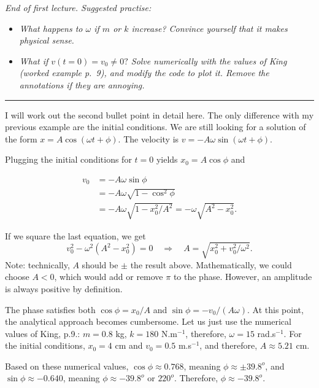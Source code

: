 \documentclass[11pt]{article}
\begin{document}
\emph{End of first lecture. Suggested practise:}

\begin{itemize}
\item
  \emph{What happens to \(\omega\) if \(m\) or \(k\) increase? Convince
  yourself that it makes physical sense.}
\item
  \emph{What if \(v(t=0) = v_0 \neq 0?\) Solve numerically with the
  values of King (worked example p.~9), and modify the code to plot it.
  Remove the annotations if they are annoying.}
\end{itemize}

\begin{center}\rule{0.5\linewidth}{\linethickness}\end{center}

    I will work out the second bullet point in detail here. The only
difference with my previous example are the initial conditions. We are
still looking for a solution of the form \(x = A\cos(\omega t + \phi)\).
The velocity is \(v = -A\omega\sin(\omega t + \phi)\).

Plugging the initial conditions for \(t=0\) yields \(x_0 = A \cos\phi\)
and

\begin{align*}
    v_0 & = -A\omega\sin\phi \\
        & = -A\omega\sqrt{1-\cos^2\phi} \\
        & = -A\omega\sqrt{1-x_0^2/A^2} = -\omega\sqrt{A^2-x_0^2}.
\end{align*}

    If we square the last equation, we get
\[ v_0^2 - \omega^2(A^2 - x_0^2) = 0 \quad\Rightarrow\quad  A = \sqrt{x_0^2 + v_0^2/\omega^2}. \]
Note: technically, \(A\) should be \(\pm\) the result above.
Mathematically, we could choose \(A<0\), which would add or remove
\(\pi\) to the phase. However, an amplitude is always positive by
definition.

    The phase satisfies both \(\cos\phi = x_0/A\) and
\(\sin\phi = -v_0/(A\omega)\). At this point, the analytical approach
becomes cumbersome. Let us just use the numerical values of King, p.9.:
\(m = 0.8\) kg, \(k = 180\) N.m\(^{-1}\), therefore, \(\omega = 15\)
rad.s\(^{-1}\). For the initial conditions, \(x_0 = 4\) cm and
\(v_0 = 0.5\) m.s\(^{-1}\), and therefore, \(A \approx 5.21\) cm.

    Based on these numerical values, \(\cos\phi \approx 0.768\), meaning
\(\phi \approx \pm 39.8^o\), and \(\sin\phi \approx -0.640\), meaning
\(\phi \approx -39.8^o\) or \(220^o\). Therefore,
\(\phi \approx -39.8^o\).
\end{document}
